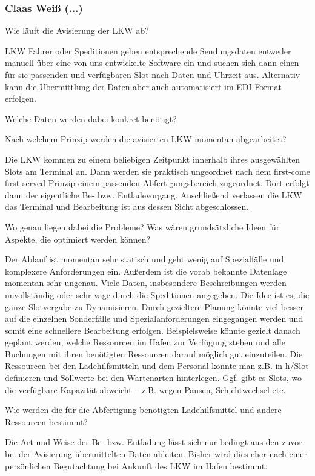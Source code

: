 \subsubsection*{Claas Weiß (...)}

Wie läuft die Avisierung der LKW ab?

LKW Fahrer oder Speditionen geben entsprechende Sendungsdaten entweder manuell über eine von uns entwickelte Software ein und suchen sich dann einen für sie passenden und verfügbaren Slot nach Daten und Uhrzeit aus. Alternativ kann die Übermittlung der Daten aber auch automatisiert im EDI-Format erfolgen.

Welche Daten werden dabei konkret benötigt?



Nach welchem Prinzip werden die avisierten LKW momentan abgearbeitet?

Die LKW kommen zu einem beliebigen Zeitpunkt innerhalb ihres ausgewählten Slots am Terminal an. Dann werden sie praktisch ungeordnet nach dem first-come first-served Prinzip einem passenden Abfertigungsbereich zugeordnet. Dort erfolgt dann der eigentliche Be- bzw. Entladevorgang. Anschließend verlassen die LKW das Terminal und Bearbeitung ist aus dessen Sicht abgeschlossen.


Wo genau liegen dabei die Probleme? Was wären grundsätzliche Ideen für Aspekte, die optimiert werden können?

Der Ablauf ist momentan sehr statisch und geht wenig auf Spezialfälle und komplexere Anforderungen ein. Außerdem ist die vorab bekannte Datenlage momentan sehr ungenau. Viele Daten, insbesondere Beschreibungen werden unvollständig oder sehr vage durch die Speditionen angegeben. Die Idee ist es, die ganze Slotvergabe zu Dynamisieren. Durch gezieltere Planung könnte viel besser auf die einzelnen Sonderfälle und Spezialanforderungen eingegangen werden und somit eine schnellere Bearbeitung erfolgen. Beispielsweise könnte gezielt danach geplant werden, welche Ressourcen im Hafen zur Verfügung stehen und alle Buchungen mit ihren benötigten Ressourcen darauf möglich gut einzuteilen. Die Ressourcen bei den Ladehilfsmitteln und dem Personal könnte man z.B. in h/Slot definieren und Sollwerte bei den Wartenarten hinterlegen. Ggf. gibt es Slots, wo die verfügbare Kapazität abweicht – z.B. wegen Pausen, Schichtwechsel etc.


Wie werden die für die Abfertigung benötigten Ladehilfsmittel und andere Ressourcen bestimmt?

Die Art und Weise der Be- bzw. Entladung lässt sich nur bedingt aus den zuvor bei der Avisierung übermittelten Daten ableiten. Bisher wird dies eher nach einer persönlichen Begutachtung bei Ankunft des LKW im Hafen bestimmt.


